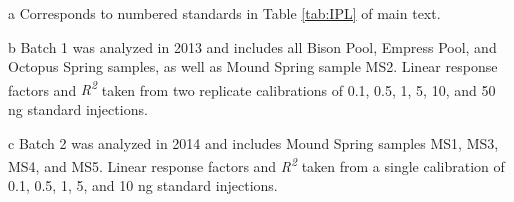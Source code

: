 \begin{table}
\begin{threeparttable}
\begin{tablenotes}
\small
\item [a] Corresponds to numbered standards in Table \ref{tab:IPL} of main text.
\item [b] Batch 1 was analyzed in 2013 and includes all Bison Pool, Empress Pool, and Octopus Spring samples, as well as Mound Spring sample MS2. Linear response factors and \textit{R\textsuperscript{2}} taken from two replicate calibrations of 0.1, 0.5, 1, 5, 10, and 50 ng standard injections.
\item [c] Batch 2 was analyzed in 2014 and includes Mound Spring samples MS1, MS3, MS4, and MS5. Linear response factors and \textit{R\textsuperscript{2}} taken from a single calibration of 0.1, 0.5, 1, 5, and 10 ng standard injections.

\end{tablenotes}

  \label{tab:RF}
  \end{threeparttable}
\end{table}









